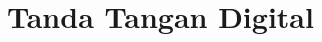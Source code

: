 \documentclass[../buku_kriptografi.tex]{subfiles}
\begin{document}
\ifdefined\InMainDocument\else\setcounter{chapter}{9}\fi

\chapter{Tanda Tangan Digital}





\ifdefined\InMainDocument\else


\fi
\end{document}
